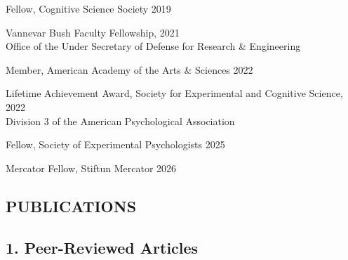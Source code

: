 \documentclass[10 pt]{article}
\begin{document}
Fellow, Cognitive Science Society \hspace{3.54in} 2019
    \smallskip

Vannevar Bush Faculty Fellowship, \hspace{3.42in} 2021
\\Office of the Under Secretary of Defense for Research \& Engineering
    \smallskip

Member, American Academy of the Arts \& Sciences \hspace{2.37in} 2022
    \smallskip

Lifetime Achievement Award, Society for Experimental and Cognitive Science, \hspace{0.77in} 2022
\\Division 3 of the American Psychological Association
    \smallskip

Fellow, Society of Experimental Psychologists \hspace{2.78in} 2025

Mercator Fellow, Stiftun Mercator \hspace{3.48in} 2026
\smallskip

\newpage



\begin{center}
\section*{PUBLICATIONS} \label{secPUBLICATIONS}
\end{center}



\subsection*{1. Peer-Reviewed Articles}
\label{secPUBLICATIONS1}

\begin{refsection}
    \nocite{*}


    \printbibliography[
        heading=none,
        env=jdcounter,
        keyword=article
    ]

    \printbibliography[
        heading=none,
        keyword=article,
        resetnumbers=true
    ]
\end{refsection}

\medskip


\end{document}
